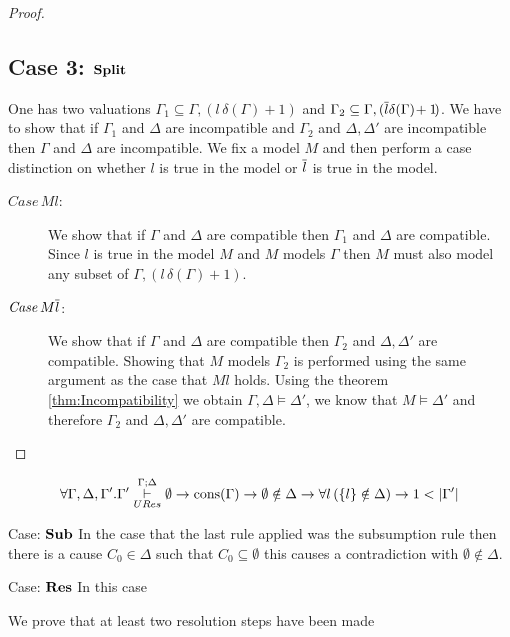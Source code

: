 \begin{mytheorem}
\begin{proof}
\subsection*{Case 3: $\mathbf{Split}$}
One has two valuations $\Gamma_1 \subseteq \Gamma, (l \, \delta(\Gamma) \! + 1 \!)$ and $\Gamma_2 \subseteq \Gamma, (\overline{l} \delta(\Gamma) \! + 1 \!)$. We have to show that if  $\Gamma_1$ and $\Delta$ are incompatible  and  $\Gamma_2$ and $\Delta, \Delta'$ are incompatible then $\Gamma$ and $\Delta$ are incompatible. We fix a model $M$ and then perform a case distinction on whether $l$ is true in the model or $\overline{l}$ is true in the model.
 \begin{description}
	\item[$\mathit{Case} \, M l$:] We show that if $\Gamma$ and $\Delta$ are compatible then $\Gamma_1$ and $\Delta$ are compatible. Since $l$ is true in the model $M$ and $M$ models $\Gamma$ then $M$ must also model any subset of $\Gamma,(l \, \delta(\Gamma) \! + \!1)$.
%	
\item [$\mathit{Case}\, M  \overline{l}$:] We show that if  $\Gamma$ and $\Delta$ are compatible then $\Gamma_2$ and $\Delta, \Delta'$ are compatible.  Showing that $M$ models $\Gamma_2$ is performed using the same argument as the case that $M l$ holds. Using the theorem \ref{thm:Incompatibility} we obtain $\Gamma,\Delta \models \Delta'$, we know that $M \models \Delta'$ and therefore $\Gamma_2$ and $\Delta, \Delta'$ are compatible.
\end{description}
\end{proof}
%
\end{mytheorem}


\begin{mylemma}\label{lemma:unitures}
\begin{align*}
\forall \Gamma, \Delta, \Gamma'.  \Gamma' \overset{\Gamma;\Delta}{\underset{URes}{\vdash}} \emptyset \to \mathrm{cons}(\Gamma) \to \emptyset \notin \Delta \to \forall l \,(\{ l\} \notin \Delta) \to 1 < |\Gamma'|
\end{align*}
\begin{description}
\item{Case: $\mathbf{Sub}$}
In the case that the last rule applied was the subsumption rule then there is a cause $C_0 \in \Delta$ such that $C_0 \subseteq \emptyset$ this causes a contradiction with $\emptyset \notin \Delta$.
\item{Case: $\mathbf{Res}$}
In this case 

We prove that at least two resolution steps have been made
\end{description}
\end{mylemma}




